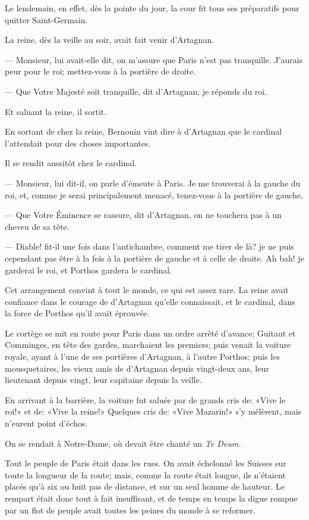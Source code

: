 Le lendemain, en effet, dès la pointe du jour, la cour fit tous ses préparatifs pour quitter Saint-Germain.

La reine, dès la veille au soir, avait fait venir d'Artagnan.

— Monsieur, lui avait-elle dit, on m'assure que Paris n'est pas tranquille. J'aurais peur pour le roi; mettez-vous à la portière de droite.

— Que Votre Majesté soit tranquille, dit d'Artagnan; je réponds du roi.

Et saluant la reine, il sortit.

En sortant de chez la reine, Bernouin vint dire à d'Artagnan que le cardinal l'attendait pour des choses importantes.

Il se rendit aussitôt chez le cardinal.

— Monsieur, lui dit-il, on parle d'émeute à Paris. Je me trouverai à la gauche du roi, et, comme je serai principalement menacé, tenez-vous à la portière de gauche.

— Que Votre Éminence se rassure, dit d'Artagnan, on ne touchera pas à un cheveu de sa tête.

— Diable! fit-il une fois dans l'antichambre, comment me tirer de là? je ne puis cependant pas être à la fois à la portière de gauche et à celle de droite. Ah bah! je garderai le roi, et Porthos gardera le cardinal.

Cet arrangement convint à tout le monde, ce qui est assez rare. La reine avait confiance dans le courage de d'Artagnan qu'elle connaissait, et le cardinal, dans la force de Porthos qu'il avait éprouvée.

Le cortège se mit en route pour Paris dans un ordre arrêté d'avance; Guitaut et Comminges, en tête des gardes, marchaient les premiers; puis venait la voiture royale, ayant à l'une de ses portières d'Artagnan, à l'autre Porthos; puis les mousquetaires, les vieux amis de d'Artagnan depuis vingt-deux ans, leur lieutenant depuis vingt, leur capitaine depuis la veille.

En arrivant à la barrière, la voiture fut saluée par de grands cris de: «Vive le roi!» et de: «Vive la reine!» Quelques cris de: «Vive Mazarin!» s'y mêlèrent, mais n'eurent point d'échos.

On se rendait à Notre-Dame, où devait être chanté un \textit{Te Deum.}

Tout le peuple de Paris était dans les rues. On avait échelonné les Suisses sur toute la longueur de la route; mais, comme la route était longue, ils n'étaient placés qu'à six ou huit pas de distance, et sur un seul homme de hauteur. Le rempart était donc tout à fait insuffisant, et de temps en temps la digue rompue par un flot de peuple avait toutes les peines du monde à se reformer.

